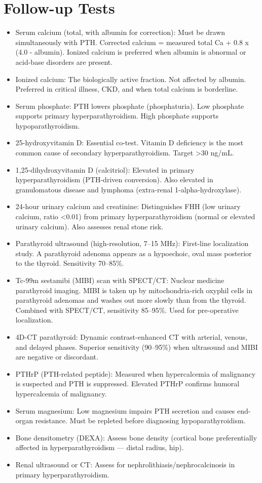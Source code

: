 \section*{Follow-up Tests}
\begin{itemize}
  \item Serum calcium (total, with albumin for correction): Must be drawn simultaneously with PTH. Corrected calcium = measured total Ca + 0.8 x (4.0 - albumin). Ionized calcium is preferred when albumin is abnormal or acid-base disorders are present.
  \item Ionized calcium: The biologically active fraction. Not affected by albumin. Preferred in critical illness, CKD, and when total calcium is borderline.
  \item Serum phosphate: PTH lowers phosphate (phosphaturia). Low phosphate supports primary hyperparathyroidism. High phosphate supports hypoparathyroidism.
  \item 25-hydroxyvitamin D: Essential co-test. Vitamin D deficiency is the most common cause of secondary hyperparathyroidism. Target >30 ng/mL.
  \item 1,25-dihydroxyvitamin D (calcitriol): Elevated in primary hyperparathyroidism (PTH-driven conversion). Also elevated in granulomatous disease and lymphoma (extra-renal 1-alpha-hydroxylase).
  \item 24-hour urinary calcium and creatinine: Distinguishes FHH (low urinary calcium, ratio <0.01) from primary hyperparathyroidism (normal or elevated urinary calcium). Also assesses renal stone risk.
  \item Parathyroid ultrasound (high-resolution, 7--15 MHz): First-line localization study. A parathyroid adenoma appears as a hypoechoic, oval mass posterior to the thyroid. Sensitivity 70--85\%.
  \item Tc-99m sestamibi (MIBI) scan with SPECT/CT: Nuclear medicine parathyroid imaging. MIBI is taken up by mitochondria-rich oxyphil cells in parathyroid adenomas and washes out more slowly than from the thyroid. Combined with SPECT/CT, sensitivity 85--95\%. Used for pre-operative localization.
  \item 4D-CT parathyroid: Dynamic contrast-enhanced CT with arterial, venous, and delayed phases. Superior sensitivity (90--95\%) when ultrasound and MIBI are negative or discordant.
  \item PTHrP (PTH-related peptide): Measured when hypercalcemia of malignancy is suspected and PTH is suppressed. Elevated PTHrP confirms humoral hypercalcemia of malignancy.
  \item Serum magnesium: Low magnesium impairs PTH secretion and causes end-organ resistance. Must be repleted before diagnosing hypoparathyroidism.
  \item Bone densitometry (DEXA): Assess bone density (cortical bone preferentially affected in hyperparathyroidism --- distal radius, hip).
  \item Renal ultrasound or CT: Assess for nephrolithiasis/nephrocalcinosis in primary hyperparathyroidism.
\end{itemize}


